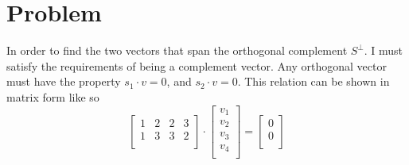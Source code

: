 \documentclass{article}
\begin{document}
\section{Problem}
In order to find the two vectors that span the orthogonal complement $S^{\perp}$. I must satisfy the requirements of being a complement vector. Any orthogonal vector must have the property $s_1 \cdot v = 0$, and $s_2 \cdot v = 0$. This relation can be shown in matrix form like so
\[
\begin{bmatrix}
1 & 2 & 2 & 3 \\
1 & 3 & 3 & 2 \\
\end{bmatrix}
\cdot
\begin{bmatrix}
v_1 \\
v_2 \\
v_3 \\
v_4 \\
\end{bmatrix}
=
\begin{bmatrix}
0 \\
0 \\
\end{bmatrix}
\]
\end{document}
